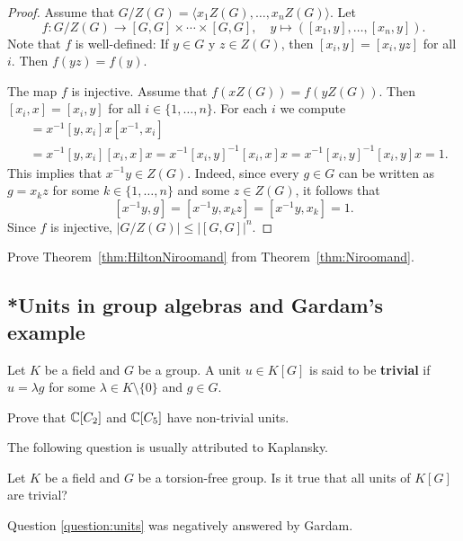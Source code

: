 \begin{proof}
	Assume that $G/Z(G)=\langle x_1Z(G),\dots,x_nZ(G)\rangle$. Let 
	\[
		f\colon G/Z(G)\to [G,G]\times\cdots\times [G,G],
		\quad
		y\mapsto ([x_1,y],\dots,[x_n,y]).
	\]
	Note that $f$ is well-defined: If $y\in G$ y $z\in Z(G)$, then $[x_i,y]=[x_i,yz]$ for all $i$. 
	Then $f(yz)=f(y)$.
	 
	The map $f$ is injective. Assume that $f(xZ(G))=f(yZ(G))$. Then 
	$[x_i,x]=[x_i,y]$ for all $i\in\{1,\dots,n\}$. For each $i$ we compute  
	\begin{align*}
		[x^{-1}y,x_i] &= x^{-1}[y,x_i]x[x^{-1},x_i]\\
		&=x^{-1}[y,x_i][x_i,x]x=x^{-1}[x_i,y]^{-1}[x_i,x]x=x^{-1}[x_i,y]^{-1}[x_i,y]x=1.
	\end{align*}
	This implies that $x^{-1}y\in Z(G)$. Indeed, since  
	every $g\in G$ can be written as $g=x_kz$ for some $k\in\{1,\dots,n\}$ and some $z\in Z(G)$, 
	it follows that 
    \[
    [x^{-1}y,g]=[x^{-1}y,x_kz]=[x^{-1}y,x_k]=1.
    \]
    Since $f$ is injective, 
	$|G/Z(G)|\leq |[G,G]|^n$. 
\end{proof}

\begin{exercise}
    Prove Theorem~\ref{thm:HiltonNiroomand} from Theorem~\ref{thm:Niroomand}. 
\end{exercise}


\subsection{*Units in group algebras and Gardam's example}

Let $K$ be a field and $G$ be a group. A unit $u\in K[G]$ is said
to be \textbf{trivial} if $u=\lambda g$ for some $\lambda\in K\setminus\{0\}$ and
$g\in G$.	

\begin{exercise}
\label{xca:non_trivial:C2andC5}
	Prove that $\mathbb{C}[C_2]$ and $\mathbb{C}[C_5]$ have non-trivial units.
\end{exercise}

The following question is usually attributed to Kaplansky. 

\begin{question}
	\label{question:units}
	Let $K$ be a field and $G$ be a torsion-free group. Is it true that all units of $K[G]$ are
	trivial?
\end{question}

Question \ref{question:units} was negatively answered by Gardam. 

